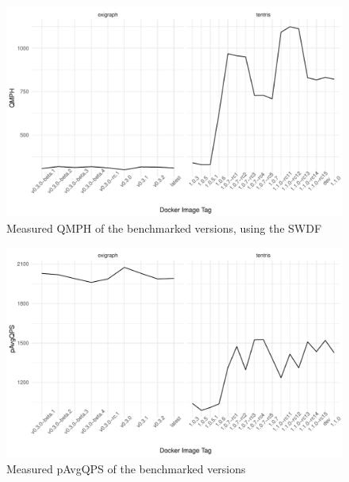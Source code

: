\begin{figure}[tbph]
	\centering
	\includegraphics[width=.8\textwidth]{figures/QMPH.pdf}
	\caption{Measured QMPH of the benchmarked \ts{} versions, using the SWDF}
	\label{fig:QMPH}
\end{figure}

\begin{figure}[tbph]
	\centering
	\includegraphics[width=.8\textwidth]{figures/pAvgQPS.pdf}
	\caption{Measured pAvgQPS of the benchmarked \ts{} versions}
	\label{fig:pAvgQPS}
\end{figure}











